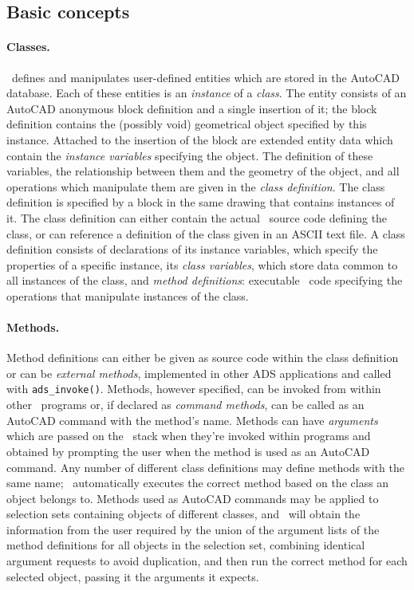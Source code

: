 \documentclass{article}
\begin{document}
\subsection{Basic concepts}

\paragraph{Classes.}
\cw\ defines and manipulates user-defined entities which are
stored in the AutoCAD database.  Each of these entities is an {\em
instance} of a {\em class}.  The entity consists of an AutoCAD
anonymous block definition and a single insertion of it; the block
definition contains the (possibly void) geometrical object specified
by this instance.  Attached to the insertion of the block are extended
entity data which contain the {\em instance variables} specifying the
object.  The definition of these variables, the relationship between
them and the geometry of the object, and all operations which
manipulate
them are given in the {\em class definition}.  The class definition
is specified by a block in the same drawing that contains instances of
it.  The class definition can either contain the actual \cw\ source
code defining the class, or can reference a definition of the class
given in an ASCII text file.  A class definition consists of
declarations of its instance variables, which specify the properties of
a specific instance, its {\em class variables}, which store data
common to all instances of the class, and {\em method definitions}:
executable \cw\ code specifying the operations
that manipulate instances of the class.

\paragraph{Methods.}
Method definitions can either be given as source code within the class
definition or can be {\em external methods}, implemented in other ADS
applications and called with \verb+ads_invoke()+.  Methods, however
specified, can be invoked from within other \cw\ programs or, if
declared as {\em command methods}, can be called as an AutoCAD command
with the method's name.  Methods can have {\em arguments} which
are passed on the \atlas\ stack when they're invoked within programs
and obtained by prompting the user when the method is used as an
AutoCAD command.  Any number of different class definitions may
define methods with the same name; \cw\ automatically executes
the correct method based on the class an object belongs to.
Methods used as AutoCAD commands may be applied to selection
sets containing objects of different classes, and \cw\ will obtain the
information from the user required by the union of the argument lists
of the method definitions for all objects in the selection set,
combining identical argument requests to avoid duplication, and then
run the correct method for each selected object, passing it the
arguments it expects.
\end{document}
